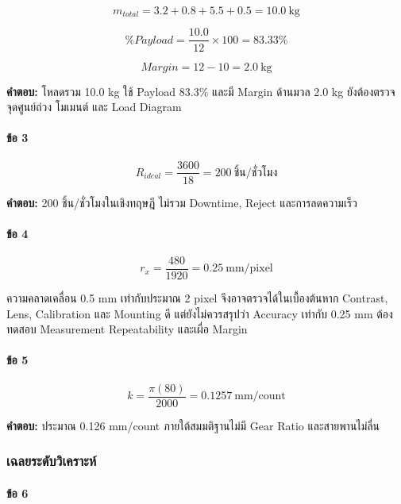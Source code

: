 \[
m_{total}=3.2+0.8+5.5+0.5=10.0\ \text{kg}
\]

\[
\%Payload=\frac{10.0}{12}\times100=83.33\%
\]

\[
Margin=12-10=2.0\ \text{kg}
\]

\textbf{คำตอบ:} โหลดรวม 10.0 kg ใช้ Payload 83.3\% และมี Margin ด้านมวล 2.0 kg ยังต้องตรวจจุดศูนย์ถ่วง โมเมนต์ และ Load Diagram

\paragraph{ข้อ 3}

\[
R_{ideal}=\frac{3600}{18}=200\ \text{ชิ้น/ชั่วโมง}
\]

\textbf{คำตอบ:} 200 ชิ้น/ชั่วโมงในเชิงทฤษฎี ไม่รวม Downtime, Reject และการลดความเร็ว

\paragraph{ข้อ 4}

\[
r_x=\frac{480}{1920}=0.25\ \text{mm/pixel}
\]

ความคลาดเคลื่อน 0.5 mm เท่ากับประมาณ 2 pixel จึงอาจตรวจได้ในเบื้องต้นหาก Contrast, Lens, Calibration และ Mounting ดี แต่ยังไม่ควรสรุปว่า Accuracy เท่ากับ 0.25 mm ต้องทดสอบ Measurement Repeatability และเผื่อ Margin

\paragraph{ข้อ 5}

\[
k=\frac{\pi(80)}{2000}=0.1257\ \text{mm/count}
\]

\textbf{คำตอบ:} ประมาณ 0.126 mm/count ภายใต้สมมติฐานไม่มี Gear Ratio และสายพานไม่ลื่น

\subsubsection{เฉลยระดับวิเคราะห์}

\paragraph{ข้อ 6}

